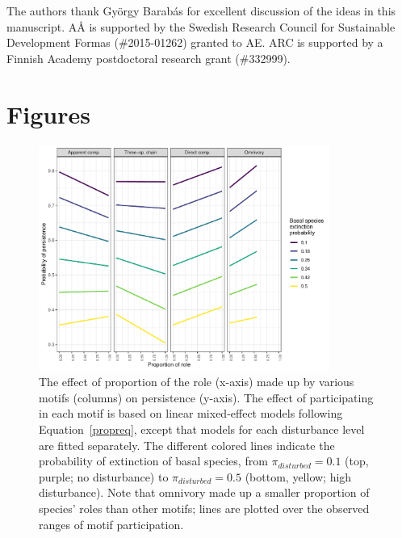 \documentclass[12pt]{article}
\begin{document}
\begin{spacing}{2.0}
    The authors thank György Barabás for excellent discussion of the ideas in this manuscript. AÅ is supported by the Swedish Research Council for Sustainable Development Formas (\#2015-01262) granted to AE. ARC is supported by a Finnish Academy postdoctoral research grant (\#332999).

\clearpage    

\section*{Figures}
    
            
    \begin{figure}[hb!]
        \centering
        \includegraphics[width=0.85\textwidth]{figures/prop_lmer_allCS.pdf}
        \caption{The effect of proportion of the role (x-axis) made up by various motifs (columns) on persistence (y-axis). The effect of participating in each motif is based on linear mixed-effect models following Equation~\ref{propreq}, except that models for each  disturbance level are fitted separately. The different colored lines indicate the probability of extinction of basal species, from $\pi_{disturbed} = 0.1$ (top, purple; no disturbance) to $\pi_{disturbed} = 0.5$ (bottom, yellow; high disturbance). Note that omnivory made up a smaller proportion of species' roles than other motifs; lines are plotted over the observed ranges of motif participation.}
    \label{fig:prop_lmer_all}
    \end{figure}
        


\end{spacing}
\end{document}
